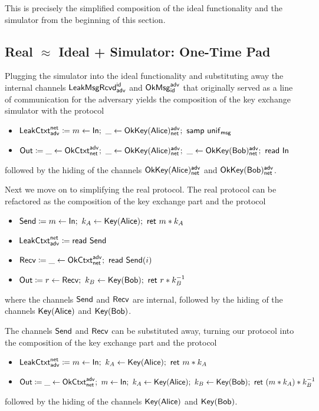 \noindent This is precisely the simplified composition of the ideal functionality and the simulator from the beginning of this section.

\subsection{Real $\approx$ Ideal + Simulator: One-Time Pad}
Plugging the simulator into the ideal functionality and substituting away the internal channels $\mathsf{LeakMsgRcvd}^{\mathsf{id}}_{\mathsf{adv}}$ and $\mathsf{OkMsg}^{\mathsf{adv}}_{\mathsf{id}}$ that originally served as a line of communication for the adversary yields the composition of the key exchange simulator with the protocol
\begin{itemize}
\item $\LeakCtxt^\net_\adv \coloneqq m \leftarrow \In; \ \_ \leftarrow \OkKey(\Alice)^\adv_\net; \ \samp{\unif_\msg}$
\item $\mathsf{Out} \coloneqq \_ \leftarrow \mathsf{OkCtxt}^{\mathsf{adv}}_{\mathsf{net}}; \ \_ \leftarrow \mathsf{OkKey}(\mathsf{Alice})^{\mathsf{adv}}_{\mathsf{net}}; \ \_ \leftarrow \mathsf{OkKey}(\mathsf{Bob})^{\mathsf{adv}}_{\mathsf{net}}; \  \mathsf{read} \ \mathsf{In}$
\end{itemize}
followed by the hiding of the channels $\mathsf{OkKey}(\mathsf{Alice})^{\mathsf{adv}}_{\mathsf{net}}$ and $\mathsf{OkKey}(\mathsf{Bob})^{\mathsf{adv}}_{\mathsf{net}}$.

Next we move on to simplifying the real protocol. The real protocol can be refactored as the composition of the key exchange part and the protocol
\begin{itemize}
\item $\Send \coloneqq m \leftarrow \In; \ k_A \leftarrow \Key(\Alice); \ \ret{m * k_A}$
\item $\mathsf{LeakCtxt}^{\mathsf{net}}_{\mathsf{adv}} \coloneqq \mathsf{read} \ \mathsf{Send}$
\item $\mathsf{Recv} \coloneqq \_ \leftarrow \mathsf{OkCtxt}^{\mathsf{adv}}_{\mathsf{net}}; \ \mathsf{read} \ \mathsf{Send}(i)$
\item $\Out \coloneqq r \leftarrow \Recv; \ k_B \leftarrow \Key(\Bob); \ \ret{r * k_B^{-1}}$
\end{itemize}
where the channels $\mathsf{Send}$ and $\mathsf{Recv}$ are internal, followed by the hiding of the channels $\mathsf{Key}(\mathsf{Alice})$ and $\mathsf{Key}(\mathsf{Bob})$.

The channels $\mathsf{Send}$ and $\mathsf{Recv}$ can be substituted away, turning our protocol into the composition of the key exchange part and the protocol
\begin{itemize}
\item $\mathsf{LeakCtxt}^{\mathsf{net}}_{\mathsf{adv}} \coloneqq m \leftarrow \mathsf{In}; \ k_A \leftarrow \mathsf{Key}(\mathsf{Alice}); \ \mathsf{ret} \ m * k_A$
\item $\Out \coloneqq \_ \leftarrow \OkCtxt^\adv_\net; \ m \leftarrow \In; \ k_A \leftarrow \Key(\Alice); \ k_B \leftarrow \Key(\Bob); \ \ret{(m * k_A) * k_B^{-1}}$
\end{itemize}
followed by the hiding of the channels $\mathsf{Key}(\mathsf{Alice})$ and $\mathsf{Key}(\mathsf{Bob})$.

